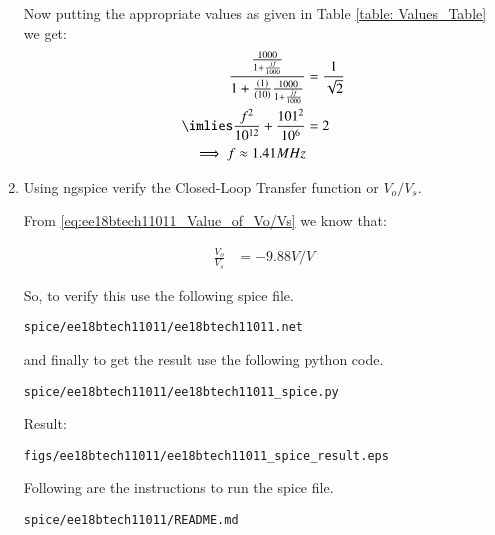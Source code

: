 \begin{enumerate}[label=\arabic*.,ref=\theenumi]
Now putting the appropriate values as given in Table \ref{table: Values_Table} we get:
\begin{align}
     \frac{\frac{1000}{1 + \frac{jf}{1000}}}{1 + \frac{(1)}{(10)}\frac{1000}{1 + \frac{jf}{1000}}} &= \frac{1}{\sqrt{2}}
\\
     \imlies \frac{f^2}{10^{1 2}} + \frac{101^2}{10^6} &= 2
\\
     \implies f \approx 1.41MHz
\end{align}
\item Using ngspice verify the Closed-Loop Transfer function or $V_{o}/V_{s}$.

\solution From \ref{eq:ee18btech11011_Value_of_Vo/Vs} we know that:

\begin{align}
    \frac{V_{o}}{V_{s}} &= -9.88V/V
\end{align}

So, to verify this use the following spice file.

\begin{lstlisting}
spice/ee18btech11011/ee18btech11011.net
\end{lstlisting}

and finally to get the result use the following python code.

\begin{lstlisting}
spice/ee18btech11011/ee18btech11011_spice.py
\end{lstlisting}

Result:
\begin{lstlisting}
figs/ee18btech11011/ee18btech11011_spice_result.eps
\end{lstlisting}

Following are the instructions to run the spice file.
\begin{lstlisting}
spice/ee18btech11011/README.md
\end{lstlisting}


\end{enumerate}
